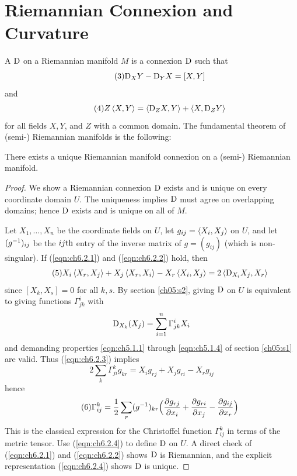 \documentclass[../main]{subfiles}
\begin{document}
\section{Riemannian Connexion and Curvature}\label{ch06:s2}

A  $\mathrm{D}$ on a Riemannian manifold $M$ is a connexion $\mathrm{D}$ such that
\begin{equation}\tag{3}\label{eqn:ch6.2.1}
    \mathrm{D}_XY-\mathrm{D}_YX=[X,Y]
\end{equation}
and
\begin{equation}\tag{4}\label{eqn:ch6.2.2}
    Z\left\langle X,Y\right\rangle = \left\langle\mathrm{D}_ZX,Y\right\rangle+\left\langle X,\mathrm{D}_ZY\right\rangle
\end{equation}
for all fields $X,Y$, and $Z$ with a common domain. The fundamental theorem of (semi-) Riemannian manifolds is the following:



\begin{theorem} \label{thm:ch6.2.1}
There exists a unique Riemannian manifold connexion on a (semi-) Riemannian manifold.
\end{theorem}

\begin{proof}
We show a Riemannian connexion $\mathrm{D}$ exists and is unique on every coordinate domain $U$. The uniqueness implies $\mathrm{D}$ must agree on overlapping domains; hence $\mathrm{D}$ exists and is unique on all of $M$.

Let $X_1,\ldots,X_n$ be the coordinate fields on $U$, let $g_{ij}=\left\langle X_i,X_j\right\rangle$ on $U$, and let $(g^{-1})_{ij}$ be the $ij\text{th}$ entry of the inverse matrix of $g=(g_{ij})$ (which is non-singular). If (\ref{eqn:ch6.2.1}) and (\ref{eqn:ch6.2.2}) hold, then
\begin{equation}\tag{5}\label{eqn:ch6.2.3}
    X_i\left\langle X_r,X_j\right\rangle+X_j\left\langle X_r,X_i\right\rangle-X_r\left\langle X_i,X_j\right\rangle = 2\left\langle\mathrm{D}_{X_i}X_j,X_r\right\rangle
\end{equation}
since $[X_k,X_s]=0$ for all $k,s$. By section \ref{ch05:s2}, giving $\mathrm{D}$ on $U$ is equivalent to giving functions $\Gamma_{jk}^i$ with
\[\mathrm{D}_{X_k}(X_j) = \sum_{i=1}^n \Gamma_{jk}^iX_i\]
and demanding properties \ref{eqn:ch5.1.1} through \ref{eqn:ch5.1.4} of section \ref{ch05:s1} are valid. Thus (\ref{eqn:ch6.2.3}) implies
\[2\sum_k\Gamma_{ji}^kg_{kr} = X_ig_{rj}+X_jg_{ri}-X_rg_{ij}\]
hence
\begin{equation}\tag{6} \label{eqn:ch6.2.4}
    \Gamma_{ij}^k = \frac12\sum_r(g^{-1})_{kr}\Big(\dfrac{\partial g_{rj}}{\partial x_i}+\dfrac{\partial g_{ri}}{\partial x_j}-\dfrac{\partial g_{ij}}{\partial x_r}\Big)
\end{equation}
This is the classical expression for the Christoffel function $\Gamma_{ij}^k$ in terms of the metric tensor. Use (\ref{eqn:ch6.2.4}) to define $\mathrm{D}$ on $U$. A direct check of (\ref{eqn:ch6.2.1}) and (\ref{eqn:ch6.2.2}) shows $\mathrm{D}$ is Riemannian, and the explicit representation (\ref{eqn:ch6.2.4}) shows $\mathrm{D}$ is unique.
\end{proof}
\end{document}
